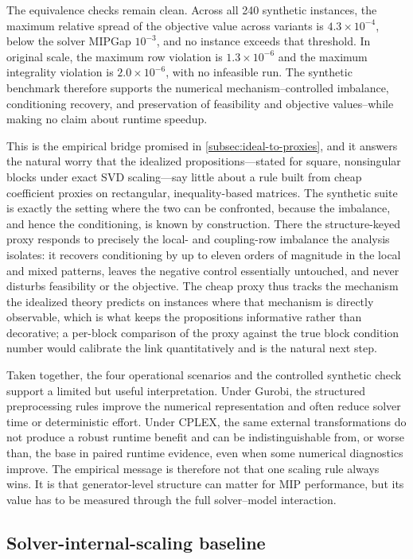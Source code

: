 \documentclass[AMA,Times1COL]{WileyNJDv5} %
\providecommand{\DIFadd}[1]{{\protect\color{blue} \sf #1}} %
\providecommand{\DIFaddbegin}{} %
\providecommand{\DIFaddend}{} %
\begin{document}
The equivalence checks remain clean. Across all 240 synthetic instances, the maximum
relative spread of the objective value across variants is \(4.3\times10^{-4}\), below the
solver MIPGap \(10^{-3}\), and no instance exceeds that threshold. In original scale, the
maximum row violation is \(1.3\times10^{-6}\) and the maximum integrality violation is
\(2.0\times10^{-6}\), with no infeasible run. The synthetic benchmark therefore supports
the numerical mechanism--controlled imbalance, conditioning recovery, and preservation of
feasibility and objective values--while making no claim about runtime speedup.

\DIFaddbegin \DIFadd{This is the empirical bridge promised in \cref{subsec:ideal-to-proxies}, and it answers the
natural worry that the idealized propositions---stated for square, nonsingular blocks under
exact SVD scaling---say little about a rule built from cheap coefficient proxies on
rectangular, inequality-based matrices. The synthetic suite is exactly the setting where the
two can be confronted, because the imbalance, and hence the conditioning, is known by
construction. There the structure-keyed proxy responds to precisely the local- and
coupling-row imbalance the analysis isolates: it recovers conditioning by up to eleven orders
of magnitude in the local and mixed patterns, leaves the negative control essentially
untouched, and never disturbs feasibility or the objective. The cheap proxy thus tracks the
mechanism the idealized theory predicts on instances where that mechanism is directly
observable, which is what keeps the propositions informative rather than decorative; a
per-block comparison of the proxy against the true block condition number would calibrate
the link quantitatively and is the natural next step.
}

\DIFaddend Taken together, the four operational scenarios and the controlled synthetic check support a limited but useful interpretation. Under Gurobi, the structured preprocessing rules improve the numerical representation and often reduce solver time or deterministic effort. Under CPLEX, the same external transformations do not produce a robust runtime benefit and can be indistinguishable from, or worse than, the base in paired runtime evidence, even when some numerical diagnostics improve. The empirical message is therefore not that one scaling rule always wins. It is that generator-level structure can matter for MIP performance, but its value has to be measured through the full solver--model interaction.

\DIFaddbegin \subsection{\DIFadd{Solver-internal-scaling baseline}}
\label{subsec:internal-scaling}
\end{document}
